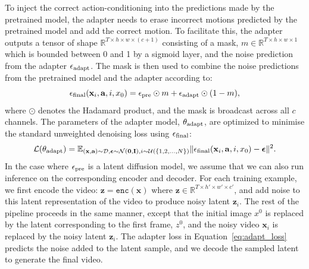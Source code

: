 To inject the correct action-conditioning into the predictions made by the pretrained model, the adapter needs to erase incorrect motions predicted by the pretrained model and add the correct motion. To facilitate this, the adapter outputs a tensor of shape $\mathbb{R}^{T \times h \times w \times (c + 1)}$ consisting of a mask, $m \in \mathbb{R}^{T \times h \times w \times 1}$ which is bounded between 0 and 1 by a sigmoid layer, and the noise prediction from the adapter $\epsilon_{\textnormal{adapt}}$.
%
The mask is then used to combine the noise predictions from the pretrained model and the adapter according to:
\begin{equation}
    \epsilon_{\textnormal{final}}(\mathbf{x}_i, \mathbf{a}, i, x_0) = \epsilon_{\textnormal{pre}} \odot m + \epsilon_{\textnormal{adapt}} \odot (1 - m), 
\end{equation}
where $\odot$ denotes the Hadamard product, and the mask is broadcast across all $c$ channels.
%
The parameters of the adapter model, $\theta_{\textnormal{adapt}}$, are optimized to minimise the standard unweighted denoising loss using $\epsilon_{\textnormal{final}}$:
\begin{equation}
    \mathcal{L}(\theta_{\textnormal{adapt}}) = \mathbb{E}_{(\mathbf{x}, \mathbf{a}) \sim \mathcal{D}, {\boldsymbol\epsilon \sim \mathcal{N}(\mathbf{0}, \mathbf{I})}, i \sim \mathcal{U}(\{1, 2, \dots, N\})}\|\epsilon_{\textnormal{final}}(\mathbf{x}_i, \mathbf{a}, i, x_0) - \boldsymbol\epsilon \|^2.  \label{eq:adapt_loss}
\end{equation}
In the case where $\epsilon_{\textnormal{pre}}$ is a latent diffusion model, we assume that we can also run inference on the corresponding encoder and decoder.
%
For each training example, we first encode the video: $\mathbf{z} = \mathtt{enc}(\mathbf{x})$ where $\mathbf{z} \in \mathbb{R}^{T \times h' \times w' \times c'}$, and add noise to this latent representation of the video to produce noisy latent $\mathbf{z}_i$.
%
The rest of the pipeline proceeds in the same manner, except that the initial image $x^0$ is replaced by  the latent corresponding to the first frame, $z^0$, and the noisy video $\mathbf{x}_i$ is replaced by the noisy latent $\mathbf{z}_i$. The adapter loss in Equation~\ref{eq:adapt_loss} predicts the noise added to the latent sample, and we decode the sampled latent to generate the final video.

